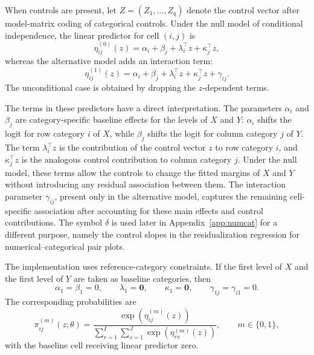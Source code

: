 \documentclass[11pt]{article}
\begin{document}
When controls are present, let $Z = (Z_1, \dots, Z_q)$ denote the control
vector after model-matrix coding of categorical controls. Under the null model
of conditional independence, the linear predictor for cell $(i,j)$ is
\begin{equation*}
\eta^{(0)}_{ij}(z)
=
\alpha_i + \beta_j + \lambda_i^\top z + \kappa_j^\top z,
\end{equation*}
whereas the alternative model adds an interaction term:
\begin{equation*}
\eta^{(1)}_{ij}(z)
=
\alpha_i + \beta_j + \lambda_i^\top z + \kappa_j^\top z + \gamma_{ij}.
\end{equation*}
The unconditional case is obtained by dropping the $z$-dependent terms.

The terms in these predictors have a direct interpretation. The parameters
$\alpha_i$ and $\beta_j$ are category-specific baseline effects for the levels
of $X$ and $Y$: $\alpha_i$ shifts the logit for row category $i$ of $X$, while
$\beta_j$ shifts the logit for column category $j$ of $Y$. The term
$\lambda_i^\top z$ is the contribution of the control vector $z$ to row
category $i$, and $\kappa_j^\top z$ is the analogous control contribution to
column category $j$. Under the null model, these terms allow the controls to
change the fitted margins of $X$ and $Y$ without introducing any residual
association between them. The interaction parameter $\gamma_{ij}$, present only
in the alternative model, captures the remaining cell-specific association
after accounting for these main effects and control contributions. The symbol
$\delta$ is used later in Appendix~\ref{app:numcat} for a different purpose,
namely the control slopes in the residualization regression for
numerical--categorical pair plots.

The implementation uses reference-category constraints. If the first level of
$X$ and the first level of $Y$ are taken as baseline categories, then
\begin{equation*}
\alpha_1 = \beta_1 = 0,
\qquad
\lambda_1 = \mathbf{0},
\qquad
\kappa_1 = \mathbf{0},
\qquad
\gamma_{1j} = \gamma_{i1} = 0.
\end{equation*}
The corresponding probabilities are
\begin{equation*}
\pi^{(m)}_{ij}(z;\theta) =
\frac{\exp(\eta^{(m)}_{ij}(z))}
{\sum_{r=1}^{I}\sum_{s=1}^{J}\exp(\eta^{(m)}_{rs}(z))},
\qquad m \in \{0,1\},
\end{equation*}
with the baseline cell receiving linear predictor zero.
\end{document}
